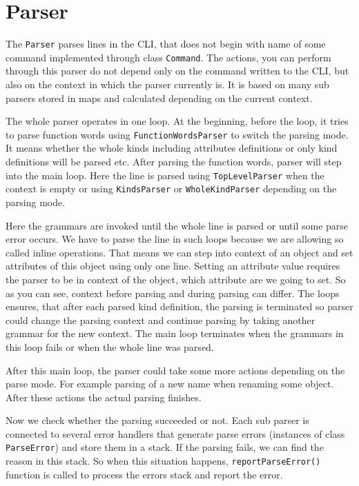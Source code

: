 \documentclass[deska]{subfiles}
\begin{document}
\section{Parser}

The {\tt Parser} parses lines in the CLI, that does not begin with name of some command implemented through class {\tt Command}.
The actions, you can perform through this parser do not depend only on the command written to the CLI, but also on the
context in which the parser currently is. It is based on many sub parsers stored in maps and calculated depending on the current context.

The whole parser operates in one loop. At the beginning, before the loop, it tries to parse function words using
{\tt FunctionWordsParser} to switch the parsing mode. It means whether the whole kinds including attributes definitions
or only kind definitions will be parsed etc. After parsing the function words, parser will step into the main loop. Here
the line is parsed using {\tt TopLevelParser} when the context is empty or using {\tt KindsParser} or {\tt WholeKindParser}
depending on the parsing mode.

Here the grammars are invoked until the whole line is parsed or until some parse error occurs. We have to parse
the line in such loops because we are allowing so called inline operations. That means we can step into context of
an object and set attributes of this object using only one line. Setting an attribute value requires the parser to
be in context of the object, which attribute are we going to set. So as you can see, context before parsing and
during parsing can differ. The loops ensures, that after each parsed kind definition, the parsing is terminated so
parser could change the parsing context and continue parsing by taking another grammar for the new context.
The main loop terminates when the grammars in this loop fails or when the whole line was parsed.

After this main loop, the parser could take some more actions depending on the parse mode. For example parsing of
a new name when renaming some object. After these actions the actual parsing finishes.

Now we check whether the parsing succeeded or not. Each sub parser is connected to several error handlers that
generate parse errors (instances of class {\tt ParseError}) and store them in a stack. If the parsing fails, we can find
the reason in this stack. So when this situation happens, {\tt reportParseError()} function is called to process
the errors stack and report the error.
\end{document}
